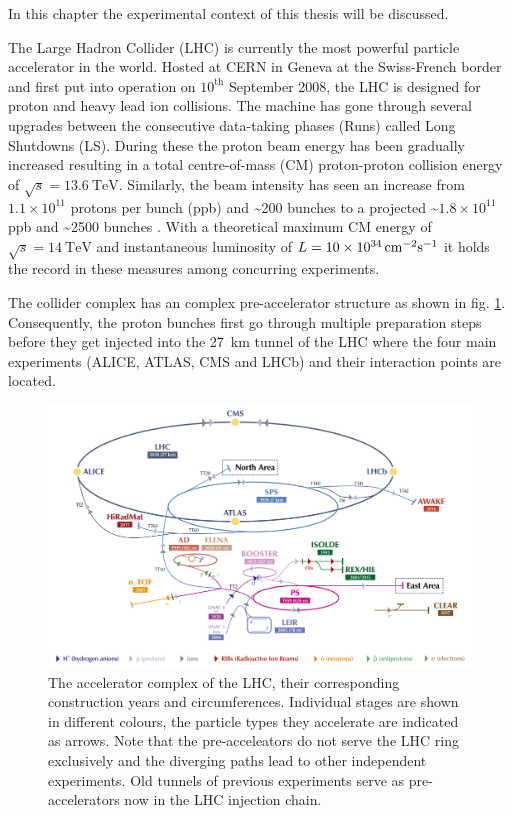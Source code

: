 \label{ch:experiment}

In this chapter the experimental context of this thesis will be discussed. 

\label{sec:theory}

The Large Hadron Collider (LHC) is currently the most powerful particle accelerator in the world. Hosted at CERN in Geneva at the Swiss-French border and first put into operation on $\text{10}^\text{th}$ September 2008, the LHC is designed for proton and heavy lead ion collisions. The machine has gone through several upgrades between the consecutive data-taking phases (Runs) called Long Shutdowns (LS). During these the proton beam energy has been gradually increased  \cite{Alici:2773265} resulting in a total centre-of-mass (CM) proton-proton collision energy of $\sqrt{s} = \SI{13.6}{\tera\electronvolt}$. Similarly, the beam intensity has seen an increase from $1.1 \times 10^{11}$ protons per bunch (ppb) and \textasciitilde200 bunches to a projected \textasciitilde$1.8 \times 10^{11}$ ppb and \textasciitilde2500 bunches \cite{Fartoukh:2790409, Karastathis:2750302}. With a theoretical maximum CM energy of $\sqrt{s} = \SI{14}{\tera\electronvolt}$ and instantaneous luminosity of $L = \SI{10d34}{\centi\meter^{-2}\second^{-1}}$ it holds the record in these measures among concurring experiments.

The collider complex has an complex pre-accelerator structure as shown in fig. \ref{fig:lhcstructure}. Consequently, the proton bunches first go through multiple preparation steps before they get injected into the \SI{27}{\kilo\meter} tunnel of the LHC where the four main experiments (ALICE, ATLAS, CMS and LHCb) and their interaction points are located. 

\begin{figure}[h!]
	\centering
	\includegraphics[width=0.8\linewidth]{figures/experiment/CCC-v2019-final-white_cut}
	\caption{The accelerator complex of the LHC, their corresponding construction years and circumferences. Individual stages are shown in different colours, the particle types they accelerate are indicated as arrows. Note that the pre-acceleators do not serve the LHC ring exclusively and the diverging paths lead to other independent experiments. Old tunnels of previous experiments serve as pre-accelerators now in the LHC injection chain. \cite{Mobs:2684277}}
	\label{fig:lhcstructure}
\end{figure}


